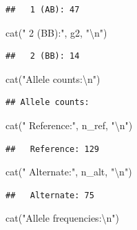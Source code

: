 \documentclass[
]{article}
\newenvironment{Shaded}{\begin{snugshade}}{\end{snugshade}}
\newcommand{\FunctionTok}[1]{\textcolor[rgb]{0.00,0.00,0.00}{#1}}
\newcommand{\NormalTok}[1]{#1}
\newcommand{\SpecialCharTok}[1]{\textcolor[rgb]{0.00,0.00,0.00}{#1}}
\newcommand{\StringTok}[1]{\textcolor[rgb]{0.31,0.60,0.02}{#1}}
\begin{document}
\begin{verbatim}
##   1 (AB): 47
\end{verbatim}

\begin{Shaded}
\begin{Highlighting}[]
\FunctionTok{cat}\NormalTok{(}\StringTok{"  2 (BB):"}\NormalTok{, g2, }\StringTok{"}\SpecialCharTok{\textbackslash{}n}\StringTok{"}\NormalTok{)}
\end{Highlighting}
\end{Shaded}

\begin{verbatim}
##   2 (BB): 14
\end{verbatim}

\begin{Shaded}
\begin{Highlighting}[]
\FunctionTok{cat}\NormalTok{(}\StringTok{"Allele counts:}\SpecialCharTok{\textbackslash{}n}\StringTok{"}\NormalTok{)}
\end{Highlighting}
\end{Shaded}

\begin{verbatim}
## Allele counts:
\end{verbatim}

\begin{Shaded}
\begin{Highlighting}[]
\FunctionTok{cat}\NormalTok{(}\StringTok{"  Reference:"}\NormalTok{, n\_ref, }\StringTok{"}\SpecialCharTok{\textbackslash{}n}\StringTok{"}\NormalTok{)}
\end{Highlighting}
\end{Shaded}

\begin{verbatim}
##   Reference: 129
\end{verbatim}

\begin{Shaded}
\begin{Highlighting}[]
\FunctionTok{cat}\NormalTok{(}\StringTok{"  Alternate:"}\NormalTok{, n\_alt, }\StringTok{"}\SpecialCharTok{\textbackslash{}n}\StringTok{"}\NormalTok{)}
\end{Highlighting}
\end{Shaded}

\begin{verbatim}
##   Alternate: 75
\end{verbatim}

\begin{Shaded}
\begin{Highlighting}[]
\FunctionTok{cat}\NormalTok{(}\StringTok{"Allele frequencies:}\SpecialCharTok{\textbackslash{}n}\StringTok{"}\NormalTok{)}
\end{Highlighting}
\end{Shaded}
\end{document}
